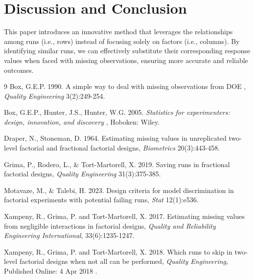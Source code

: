 \documentclass[twoside]{article}
\begin{document}
\section*{Discussion and Conclusion}   
This paper introduces an innovative method that leverages the relationships among runs (i.e., rows) instead of focusing solely on factors (i.e., columns). By identifying similar runs, we can effectively substitute their corresponding response values when faced with missing observations, ensuring more accurate and reliable outcomes.

\begin{thebibliography}{9}
Box, G.E.P. 1990. A simple way to deal with missing observations from DOE , {\it Quality Engineering } 3(2):249-254.

Box, G.E.P., Hunter, J.S., Hunter, W.G. 2005. {\it Statistics for experimenters: design, innovation, and discovery },
Hoboken: Wiley.

Draper, N., Stoneman, D. 1964. Estimating missing values in unreplicated two-level factorial and fractional factorial designs, {\it Biometrics } 20(3):443-458.

Grima, P., Rodero, L., & Tort-Martorell, X. 2019. Saving runs in fractional factorial designs, {\it Quality Engineering } 31(3):375-385.


Motavaze, M., & Talebi, H. 2023. Design criteria for model discrimination in factorial experiments with potential failing runs, {\it Stat } 12(1):e536.

Xampeny, R., Grima, P. and Tort-Martorell, X. 2017. Estimating missing values from negligible interactions in factorial designs, {\it Quality and Reliability Engineering International}, 33(6):1235-1247.

Xampeny, R., Grima, P. and Tort-Martorell, X. 2018. Which runs to skip in two-level factorial designs when not all can be performed, {\it Quality Engineering}, Published Online: 4 Apr 2018  .

\end{thebibliography}
 
\end{document}
